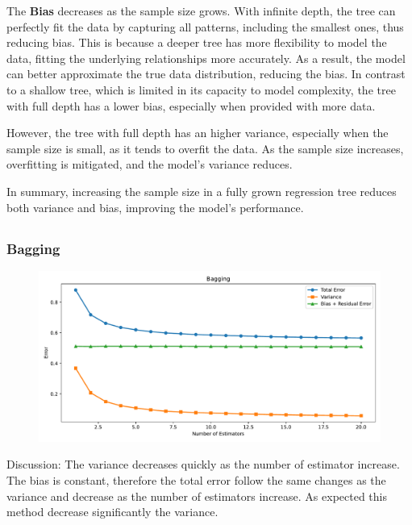 \documentclass[a4paper,10pt]{article}
\begin{document}
The \textbf{Bias} decreases as the sample size grows. With infinite depth, the tree can perfectly fit the data by capturing all patterns, including the smallest ones, thus reducing bias. This is because a deeper tree has more flexibility to model the data, fitting the underlying relationships more accurately. As a result, the model can better approximate the true data distribution, reducing the bias. In contrast to a shallow tree, which is limited in its capacity to model complexity, the tree with full depth has a lower bias, especially when provided with more data.

However, the tree with full depth has an higher variance, especially when the sample size is small, as it tends to overfit the data. As the sample size increases, overfitting is mitigated, and the model's variance reduces.

In summary, increasing the sample size in a fully grown regression tree reduces both variance and bias, improving the model’s performance.





\subsection{}

\subsubsection{Bagging}
\begin{figure}[H]
    \centering
    \includegraphics[width=0.8\linewidth]{images/2.5_bagging.pdf}
\end{figure}

Discussion:
The variance decreases quickly as the number of estimator increase. The bias is constant, therefore the total error follow the same changes as the variance and decrease as the number of estimators increase. As expected this method decrease significantly the variance.
        
\end{document}

